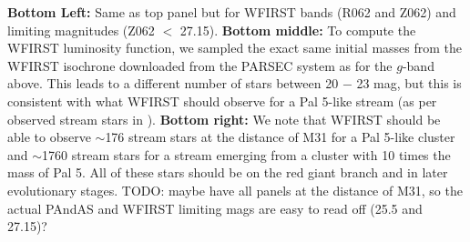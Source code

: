 \documentclass[twocolumn]{aastex62}
\newcommand{\todo}[1]{{\color{red} TODO: #1}}
\begin{document}
\begin{figure*}
{{\bf Bottom Left:} Same as top panel but for WFIRST bands (R062 and Z062) and limiting magnitudes (Z062 $<$ 27.15). {\bf Bottom middle:} To compute the WFIRST luminosity function, we sampled the exact same initial masses from the WFIRST isochrone downloaded from the PARSEC system as for the $g$-band above. This leads to a different number of stars between 20 $-$ 23 mag, but this is consistent with what WFIRST should observe for a Pal 5-like stream (as per observed stream stars in \citealt{ibata16}). {\bf Bottom right:} We note that WFIRST should be able to observe $\sim$176 stream stars at the distance of M31 for a Pal 5-like cluster and $\sim$1760 stream stars for a stream emerging from a cluster with 10 times the mass of Pal 5. All of these stars should be on the red giant branch and in later evolutionary stages.
\todo{maybe have all panels at the distance of M31, so the actual PAndAS and WFIRST limiting mags are easy to read off (25.5 and 27.15)?}}
\label{fig:iso_cfht}
\end{figure*}

%
\end{document}
